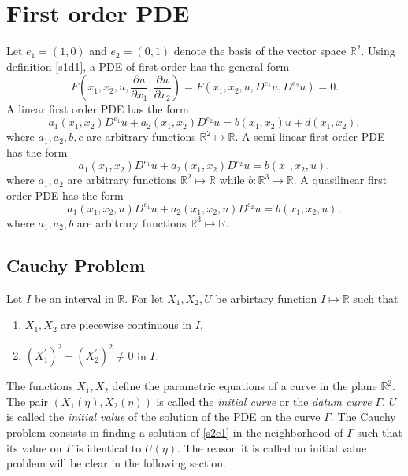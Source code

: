 \documentclass{article}
\newcommand{\pd}[2]{\frac{\partial{#1}}{\partial{#2}}}
\theoremstyle{plain}
\numberwithin{thm}{section}
\theoremstyle{plain}
\numberwithin{prop}{section}
\theoremstyle{definition}
\numberwithin{defn}{section}
\theoremstyle{remark}
\numberwithin{equation}{section}
\begin{document}
\section{First order PDE}\label{s2}
Let $e_1 = (1, 0)$ and $e_2 = (0, 1)$ denote the basis of the vector space $\mathbb{R}^2$. Using 
definition \ref{s1d1}, a PDE of first order has the general form
\begin{equation}\label{s2e1}
F\left(x_1, x_2, u, \pd{u}{x_1}, \pd{u}{x_2}\right) = F(x_1, x_2, u, D^{e_1}u, D^{e_2}u) = 0.
\end{equation}
A linear first order PDE has the form
\begin{equation}\label{s2e2}
a_1(x_1, x_2)D^{e_1}u + a_2(x_1, x_2)D^{e_2}u = b(x_1, x_2)u + d(x_1, x_2),
\end{equation}
where $a_1, a_2, b, c$ are arbitrary functions $\mathbb{R}^2 \mapsto \mathbb{R}$. A semi-linear first
order PDE has the form
\begin{equation}\label{s2e3}
a_1(x_1, x_2)D^{e_1}u + a_2(x_1, x_2)D^{e_2}u = b(x_1, x_2, u),
\end{equation}
where $a_1, a_2$ are arbitrary functions $\mathbb{R}^2 \mapsto \mathbb{R}$ while $b:\mathbb{R}^3
\rightarrow \mathbb{R}$. A quasilinear first order PDE has the form
\begin{equation}\label{s2e4}
a_1(x_1, x_2, u)D^{e_1}u + a_2(x_1, x_2, u)D^{e_2}u = b(x_1, x_2, u),
\end{equation}
where $a_1, a_2, b$ are arbitrary functions $\mathbb{R}^3 \mapsto \mathbb{R}$.

\subsection{Cauchy Problem}\label{s2s1}
Let $I$ be an interval in $\mathbb{R}$. For let $X_1, X_2, U$ be arbirtary function $I \mapsto 
\mathbb{R}$ such that
\begin{enumerate}
\item $X_1, X_2$ are piecewise continuous in $I$,
\item $(X_1^\prime)^2 + (X_2^\prime)^2 \ne 0$ in $I$.
\end{enumerate}
The functions $X_1, X_2$ define the parametric equations of a curve in the plane $\mathbb{R}^2$. The
pair $(X_1(\eta), X_2(\eta))$ is called the \emph{initial curve} or the \emph{datum curve} $\Gamma$. 
$U$ is called the \emph{initial value} of the solution of the PDE on the curve $\Gamma$. The Cauchy 
problem consists in finding a solution of \eqref{s2e1} in the neighborhood of $\Gamma$ such that its 
value on $\Gamma$ is identical to $U(\eta)$. The reason it is called an initial value problem will
be clear in the following section.
\end{document}
